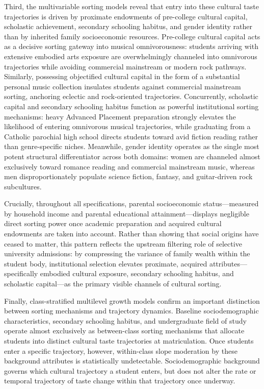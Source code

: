 \documentclass[12pt]{article}
\begin{document}
Third, the multivariable sorting models reveal that entry into these cultural taste trajectories is driven by proximate endowments of pre-college cultural capital, scholastic achievement, secondary schooling habitus, and gender identity rather than by inherited family socioeconomic resources. Pre-college cultural capital acts as a decisive sorting gateway into musical omnivorousness: students arriving with extensive embodied arts exposure are overwhelmingly channeled into omnivorous trajectories while avoiding commercial mainstream or modern rock pathways. Similarly, possessing objectified cultural capital in the form of a substantial personal music collection insulates students against commercial mainstream sorting, anchoring eclectic and rock-oriented trajectories. Concurrently, scholastic capital and secondary schooling habitus function as powerful institutional sorting mechanisms: heavy Advanced Placement preparation strongly elevates the likelihood of entering omnivorous musical trajectories, while graduating from a Catholic parochial high school directs students toward avid fiction reading rather than genre-specific niches. Meanwhile, gender identity operates as the single most potent structural differentiator across both domains: women are channeled almost exclusively toward romance reading and commercial mainstream music, whereas men disproportionately populate science fiction, fantasy, and guitar-driven rock subcultures.

Crucially, throughout all specifications, parental socioeconomic status—measured by household income and parental educational attainment—displays negligible direct sorting power once academic preparation and acquired cultural endowments are taken into account. Rather than showing that social origins have ceased to matter, this pattern reflects the upstream filtering role of selective university admissions: by compressing the variance of family wealth within the student body, institutional selection elevates proximate, acquired attributes—specifically embodied cultural exposure, secondary schooling habitus, and scholastic capital—as the primary visible channels of cultural sorting. 

Finally, class-stratified multilevel growth models confirm an important distinction between sorting mechanisms and trajectory dynamics. Baseline sociodemographic characteristics, secondary schooling habitus, and undergraduate field of study operate almost exclusively as between-class sorting mechanisms that allocate students into distinct cultural taste trajectories at matriculation. Once students enter a specific trajectory, however, within-class slope moderation by these background attributes is statistically undetectable. Sociodemographic background governs which cultural trajectory a student enters, but does not alter the rate or temporal trajectory of taste change within that trajectory once underway.
\end{document}
